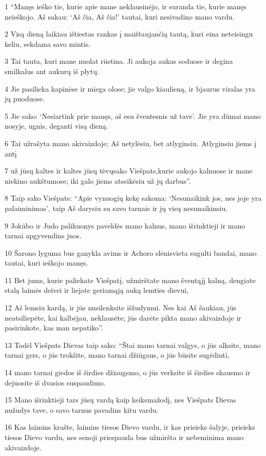 \par 1 “Manęs ieško tie, kurie apie mane neklausinėjo, ir suranda tie, kurie manęs neieškojo. Aš sakau: ‘Aš čia, Aš čia!’ tautai, kuri nesivadino mano vardu. 
\par 2 Visą dieną laikiau ištiestas rankas į maištaujančią tautą, kuri eina neteisingu keliu, sekdama savo mintis. 
\par 3 Tai tauta, kuri mane nuolat rūstina. Ji aukoja aukas soduose ir degina smilkalus ant aukurų iš plytų. 
\par 4 Jie pasilieka kapinėse ir miega olose; jie valgo kiaulieną, ir bjaurus viralas yra jų puoduose. 
\par 5 Jie sako: ‘Nesiartink prie manęs, aš esu šventesnis už tave’. Jie yra dūmai mano nosyje, ugnis, deganti visą dieną. 
\par 6 Tai užrašyta mano akivaizdoje; Aš netylėsiu, bet atlyginsiu. Atlyginsiu jiems į antį 
\par 7 už jūsų kaltes ir kaltes jūsų tėvų­sako Viešpats,­kurie aukojo kalnuose ir mane niekino aukštumose; iki galo jiems atseikėsiu už jų darbus”. 
\par 8 Taip sako Viešpats: “Apie vynuogių kekę sakoma: ‘Nesunaikink jos, nes joje yra palaiminimas’, taip Aš darysiu su savo tarnais ir jų visų nesunaikinsiu. 
\par 9 Jokūbo ir Judo palikuonys paveldės mano kalnus, mano išrinktieji ir mano tarnai apgyvendins juos. 
\par 10 Šarono lyguma bus ganykla avims ir Achoro slėnis­vieta sugulti bandai, mano tautai, kuri ieškojo manęs. 
\par 11 Bet jums, kurie paliekate Viešpatį, užmirštate mano šventąjį kalną, dengiate stalą laimės deivei ir liejate geriamąją auką lemties dievui, 
\par 12 Aš lemsiu kardą, ir jūs nusilenksite išžudymui. Nes kai Aš šaukiau, jūs neatsiliepėte, kai kalbėjau, neklausėte; jūs darėte pikta mano akivaizdoje ir pasirinkote, kas man nepatiko”. 
\par 13 Todėl Viešpats Dievas taip sako: “Štai mano tarnai valgys, o jūs alksite, mano tarnai gers, o jūs trokšite, mano tarnai džiūgaus, o jūs būsite sugėdinti, 
\par 14 mano tarnai giedos iš širdies džiaugsmo, o jūs verksite iš širdies skausmo ir dejuosite iš dvasios suspaudimo. 
\par 15 Mano išrinktieji tars jūsų vardą kaip keiksmažodį, nes Viešpats Dievas nužudys tave, o savo tarnus pavadins kitu vardu. 
\par 16 Kas laimins krašte, laimins tiesos Dievo vardu, ir kas prisieks šalyje, prisieks tiesos Dievo vardu, nes senoji priespauda bus užmiršta ir nebeminima mano akivaizdoje. 
